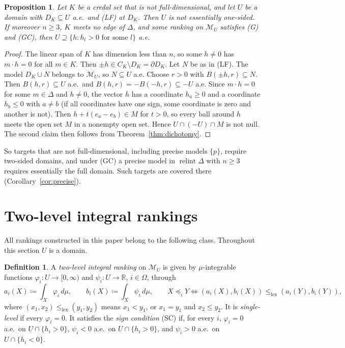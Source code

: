 \documentclass[11pt]{article}
\newcommand{\R}{\mathbb{R}}
\newcommand{\M}{\mathcal{M}}
\newcommand{\lexle}{\le_{\mathrm{lex}}}
\DeclareMathOperator{\relint}{relint}
\theoremstyle{plain}
\newtheorem{proposition}[theorem]{Proposition}
\theoremstyle{definition}
\newtheorem{definition}[theorem]{Definition}
\theoremstyle{remark}
\begin{document}
\begin{proposition}\label{prop:lowdim}
Let $K$ be a credal set that is not full-dimensional, and let $U$ be a domain with
$D_K\subseteq U$ a.e.\ and (LF) at $D_K$. Then $U$ is not essentially one-sided. If
moreover $n\ge3$, $K$ meets no edge of $\Delta$, and some ranking on $\M_U$ satisfies (G)
and (GC), then $U\supseteq\{h:h_l>0\text{ for some }l\}$ a.e.
\end{proposition}

\begin{proof}
The linear span of $K$ has dimension less than $n$, so some $h\neq0$ has $m\cdot h=0$ for
all $m\in K$. Then $\pm h\in C_K\setminus D_K=\partial D_K$. Let $N$ be as in (LF). The
model $D_K\cup N$ belongs to $\M_U$, so $N\subseteq U$ a.e. Choose $r>0$ with $B(\pm
h,r)\subseteq N$. Then $B(h,r)\subseteq U$ a.e.\ and $B(h,r)=-B(-h,r)\subseteq-U$ a.e.
Since $m\cdot h=0$ for some $m\in\Delta$ and $h\ne0$, the vector $h$ has a coordinate
$h_a\ge0$ and a coordinate $h_b\le0$ with $a\ne b$ (if all coordinates have one sign, some
coordinate is zero and another is not). Then $h+t(e_a-e_b)\in M$ for $t>0$, so every ball
around $h$ meets the open set $M$ in a nonempty open set. Hence $U\cap(-U)\cap M$ is not null. The second claim
then follows from Theorem~\ref{thm:dichotomy}.
\end{proof}

So targets that are not full-dimensional, including precise models $\{p\}$, require
two-sided domains, and under (GC) a precise model in $\relint\Delta$ with $n\ge3$ requires
essentially the full domain. Such targets are covered there (Corollary~\ref{cor:precise}).

\section{Two-level integral rankings}\label{sec:route}

All rankings constructed in this paper belong to the following class. Throughout this
section $U$ is a domain.

\begin{definition}\label{def:twolevel}
A \emph{two-level integral ranking} on $\M_U$ is given by $\mu$-integrable functions
$\varphi_i:U\to[0,\infty)$ and $\psi_i:U\to\R$, $i\in\Omega$, through
\[
  a_i(X)\coloneqq\int_X\varphi_i\,d\mu,\qquad b_i(X)\coloneqq\int_X\psi_i\,d\mu,\qquad
  X\preceq_iY\iff(a_i(X),b_i(X))\lexle(a_i(Y),b_i(Y)),
\]
where $(x_1,x_2)\lexle(y_1,y_2)$ means $x_1<y_1$, or $x_1=y_1$ and $x_2\le y_2$. It is
\emph{single-level} if every $\varphi_i=0$. It satisfies the \emph{sign condition} (SC) if,
for every $i$, $\varphi_i=0$ a.e.\ on $U\cap\{h_i>0\}$, $\psi_i<0$ a.e.\ on $U\cap
\{h_i>0\}$, and $\psi_i>0$ a.e.\ on $U\cap\{h_i<0\}$.
\end{definition}
\end{document}
